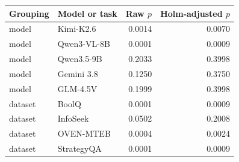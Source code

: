 \begin{tabular}{llrr}
\toprule
Grouping & Model or task & Raw $p$ & Holm-adjusted $p$ \\
\midrule
model & Kimi-K2.6 & 0.0014 & 0.0070 \\
model & Qwen3-VL-8B & 0.0001 & 0.0009 \\
model & Qwen3.5-9B & 0.2033 & 0.3998 \\
model & Gemini 3.8 & 0.1250 & 0.3750 \\
model & GLM-4.5V & 0.1999 & 0.3998 \\
dataset & BoolQ & 0.0001 & 0.0009 \\
dataset & InfoSeek & 0.0502 & 0.2008 \\
dataset & OVEN-MTEB & 0.0004 & 0.0024 \\
dataset & StrategyQA & 0.0001 & 0.0009 \\
\bottomrule
\end{tabular}
